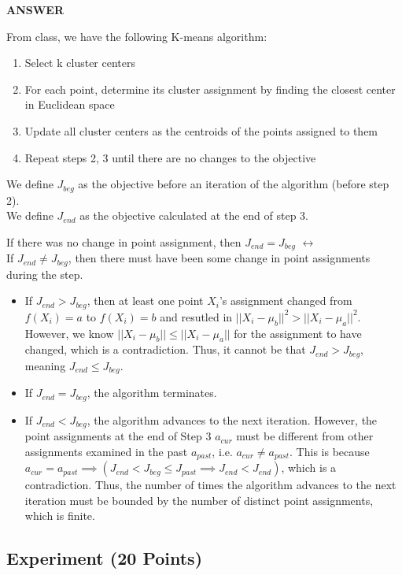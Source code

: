 \documentclass[a4paper]{article}
\newcounter{thm}
\theoremstyle{definition}
\begin{document}
\begin{enumerate}
\textbf{ANSWER}

From class, we have the following K-means algorithm:
\begin{enumerate}
    \item Select k cluster centers
    \item For each point, determine its cluster assignment by finding the closest center in Euclidean space
    \item Update all cluster centers as the centroids of the points assigned to them
    \item Repeat steps 2, 3 until there are no changes to the objective
\end{enumerate}

We define $J_{beg}$ as the objective before an iteration of the algorithm (before step 2). \\
We define $J_{end}$ as the objective calculated at the end of step 3.

If there was no change in point assignment, then $J_{end} = J_{beg}$ $\leftrightarrow$\\
If $J_{end} \neq J_{beg}$, then there must have been some change in point assignments during the step.
\begin{itemize}
    \item If $J_{end} > J_{beg}$, then at least one point $X_i$'s assignment changed from $f(X_i) = a$ to $f(X_i) = b$ and resutled in $||X_i - \mu_b||^2 > ||X_i - \mu_a||^2$. However, we know $||X_i - \mu_b|| \leq ||X_i - \mu_a||$ for the assignment to have changed, which is a contradiction. Thus, it cannot be that $J_{end} > J_{beg}$, meaning $J_{end} \leq J_{beg}$.
    \item If $J_{end} = J_{beg}$, the algorithm terminates.
    \item If $J_{end} < J_{beg}$, the algorithm advances to the next iteration. However, the point assignments at the end of Step 3 $a_{cur}$ must be different from other assignments examined in the past $a_{past}$, i.e. $a_{cur} \neq a_{past}$. This is because $a_{cur} = a_{past} \implies (J_{end} < J_{beg} \leq J_{past} \implies J_{end} < J_{end})$, which is a contradiction. Thus, the number of times the algorithm advances to the next iteration must be bounded by the number of distinct point assignments, which is finite.
\end{itemize}

\end{enumerate}



\subsection{Experiment (20 Points)}
\end{document}
